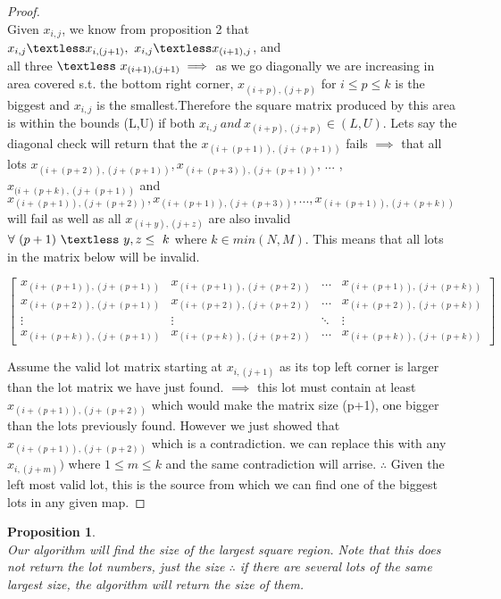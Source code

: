 \documentclass[12pt]{article}
\newtheorem{proposition}[theorem]{Proposition}
\begin{document}
\begin{proof}
~ \\ \indent Given $x_{i,j}$, we know from proposition 2 that $x_{i,j} \textless x_{i,(j+1)},\ x_{i,j}
\textless x_{(i+1),j}$, and \\ all three $\textless\ x_{(i+1),(j+1)} \implies$ as we go diagonally we are increasing
in area covered s.t. the bottom right corner, $x_{(i+p),(j+p)}$ for $i \le p \le k$ is the biggest and $x_{i,j}$ is
the smallest.Therefore the square matrix produced by this area is within the bounds (L,U) if both $x_{i,j}
\ and\ x_{(i+p),(j+p)} \in (L,U)$. Lets say the diagonal check will return that the $x_{(i+(p+1)),(j+(p+1))}$ fails
$\implies$ that all lots $x_{(i+(p+2)),(j+(p+1))},x_{(i+(p+3)),(j+(p+1))}$, ... ,$x_{(i+(p+k),(j+(p+1))}$ and
$x_{(i+(p+1)),(j+(p+2))}, x_{(i+(p+1)),(j+(p+3))},...,x_{(i+(p+1)),(j+(p+k))}$ will fail as well as all
$x_{(i+y),(j+z)}$ are also invalid $\forall\ (p+1)\ \textless\ y,z \leq\ k$ where $k \in min(N,M)$. This means that
all lots in the matrix below will be invalid.
\begin{center}
$
\begin{bmatrix}
    x_{(i+(p+1)),(j+(p+1))} & x_{(i+(p+1)),(j+(p+2))} & \dots  & x_{(i+(p+1)),(j+(p+k))} \\
    x_{(i+(p+2)),(j+(p+1))} & x_{(i+(p+2)),(j+(p+2))} & \dots  & x_{(i+(p+2)),(j+(p+k))} \\
    \vdots                  & \vdots                  & \ddots & \vdots                  \\
    x_{(i+(p+k)),(j+(p+1))} & x_{(i+(p+k)),(j+(p+2))} & \dots  & x_{(i+(p+k)),(j+(p+k))}
\end{bmatrix}
$
\end{center}
Assume the valid lot matrix starting at $x_{i,(j+1)}$ as its top left corner is larger than the lot matrix we have just
found. $\implies$ this lot must contain at least $x_{(i+(p+1)),(j+(p+2))}$ which would make the matrix size
(p+1), one bigger than the lots previously found. However we just showed that $x_{(i+(p+1)),(j+(p+2))}$ which is a
contradiction. we can replace this with any $x_{i,(j+m)})$ where $1 \leq m \leq k$ and the same contradiction will
arrise. $\therefore$ Given the left most valid lot, this is the source from which we can find one of the biggest lots
in any given map.
\end{proof}

\begin{proposition}
~ \\ \indent Our algorithm will find the size of the largest square region. Note that this does
not return the lot numbers, just the size $\therefore$ if there are several lots of the same
largest size, the algorithm will return the size of them.
\end{proposition}
\end{document}
